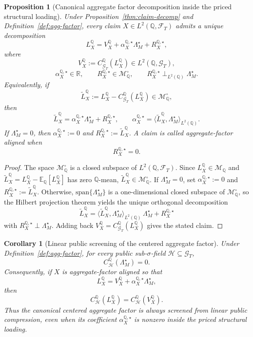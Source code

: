 \documentclass[11pt,a4paper]{amsart}
\theoremstyle{plain}
\newtheorem{proposition}[theorem]{Proposition}
\newtheorem{corollary}[theorem]{Corollary}
\theoremstyle{definition}
\theoremstyle{remark}
\newcommand{\R}{\mathbb{R}}
\newcommand{\QQ}{\mathbb{Q}}
\newcommand{\EE}{\mathbb{E}}
\newcommand{\cF}{\mathcal{F}}
\newcommand{\cG}{\mathcal{G}}
\newcommand{\cH}{\mathcal{H}}
\newcommand{\cM}{\mathcal{M}}
\begin{document}
\begin{proposition}[Canonical aggregate factor decomposition inside the priced structural loading]\label{thm:factor-decomp}
Under Proposition~\ref{thm:claim-decomp} and Definition~\ref{def:agg-factor}, every claim
\(X\in L^2(\QQ,\cF_T)\) admits a unique decomposition
\[
        L_X^\QQ
        =
        V_X^\QQ
        +
        \alpha_X^{\QQ,\star}\Lambda_M^\star
        +
        R_X^{\QQ,\star},
\]
where
\[
        V_X^\QQ:=C_{\cG_T}^\QQ(L_X^\QQ)\in L^2(\QQ,\cG_T),
\]
\[
        \alpha_X^{\QQ,\star}\in\R,
        \qquad
        R_X^{\QQ,\star}\in \cM_\QQ^\circ,
        \qquad
        R_X^{\QQ,\star}\perp_{L^2(\QQ)} \Lambda_M^\star.
\]
Equivalently, if
\[
        \widetilde L_X^\QQ:=L_X^\QQ-C_{\cG_T}^\QQ(L_X^\QQ)\in \cM_\QQ^\circ,
\]
then
\[
        \widetilde L_X^\QQ=\alpha_X^{\QQ,\star}\Lambda_M^\star+R_X^{\QQ,\star},
        \qquad
        \alpha_X^{\QQ,\star}
        =
        \langle \widetilde L_X^\QQ,\Lambda_M^\star\rangle_{L^2(\QQ)}.
\]
If \(\Lambda_M^\star=0\), then \(\alpha_X^{\QQ,\star}:=0\) and
\(R_X^{\QQ,\star}:=\widetilde L_X^\QQ\).  A claim is called \emph{aggregate-factor aligned} when
\[
        R_X^{\QQ,\star}=0.
\]
\end{proposition}

\begin{proof}
The space \(\cM_\QQ^\circ\) is a closed subspace of \(L^2(\QQ,\cF_T)\).  Since
\(L_X^\QQ\in\cM_\QQ\) and \(\widetilde L_X^\QQ=L_X^\QQ-\EE_\QQ[L_X^\QQ]\) has zero
\(\QQ\)-mean, \(\widetilde L_X^\QQ\in\cM_\QQ^\circ\).  If \(\Lambda_M^\star=0\), set
\(\alpha_X^{\QQ,\star}:=0\) and \(R_X^{\QQ,\star}:=\widetilde L_X^\QQ\).  Otherwise,
\(\mathrm{span}\{\Lambda_M^\star\}\) is a one-dimensional closed subspace of \(\cM_\QQ^\circ\), so
the Hilbert projection theorem yields the unique orthogonal decomposition
\[
        \widetilde L_X^\QQ
        =
        \langle \widetilde L_X^\QQ,\Lambda_M^\star\rangle_{L^2(\QQ)}\,\Lambda_M^\star
        +
        R_X^{\QQ,\star}
\]
with \(R_X^{\QQ,\star}\perp \Lambda_M^\star\).  Adding back
\(V_X^\QQ=C_{\cG_T}^\QQ(L_X^\QQ)\) gives the stated claim.
\end{proof}

\begin{corollary}[Linear public screening of the centered aggregate factor]\label{cor:factor-screening}
Under Definition~\ref{def:agg-factor}, for every public sub-\(\sigma\)-field \(\cH\subseteq\cG_T\),
\[
        C_{\cH}^\QQ(\Lambda_M^\star)=0.
\]
Consequently, if \(X\) is aggregate-factor aligned so that
\[
        L_X^\QQ=V_X^\QQ+\alpha_X^{\QQ,\star}\Lambda_M^\star,
\]
then
\[
        C_{\cH}^\QQ(L_X^\QQ)=C_{\cH}^\QQ(V_X^\QQ).
\]
Thus the canonical centered aggregate factor is always screened from linear public compression,
even when its coefficient \(\alpha_X^{\QQ,\star}\) is nonzero inside the priced structural loading.
\end{corollary}
\end{document}

